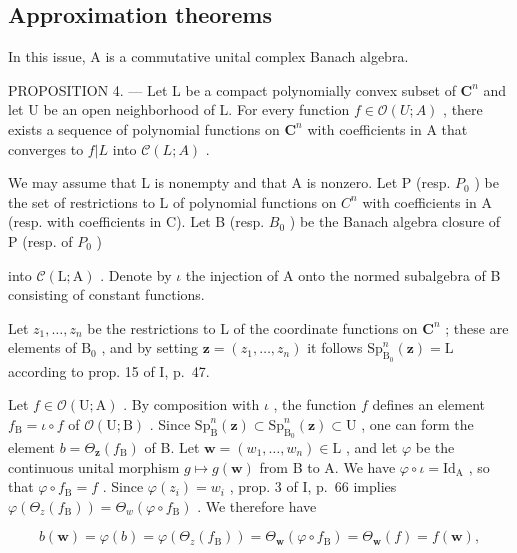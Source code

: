 \subsection{Approximation theorems}

In this issue, A is a commutative unital complex Banach algebra.

PROPOSITION 4. --- Let L be a compact polynomially convex subset of \(\mathbf{C}^{n}\) and let U be an open neighborhood of L. For every function \(f\in\mathcal{O}(U;A)\) , there exists a sequence of polynomial functions on \(\mathbf{C}^{n}\) with coefficients in A that converges to \(f|L\) into \(\mathcal{C}(L;A)\) .

We may assume that L is nonempty and that A is nonzero. Let P (resp. \(P_{0}\) ) be the set of restrictions to L of polynomial functions on \(C^{n}\) with coefficients in A (resp. with coefficients in C). Let B (resp. \(B_{0}\) ) be the Banach algebra closure of P (resp. of \(P_{0}\) )

into \(\mathcal{C}(\mathrm{L};\mathrm{A})\) . Denote by \(\iota\) the injection of A onto the normed subalgebra of B consisting of constant functions.

Let \(z_{1},\ldots,z_{n}\) be the restrictions to L of the coordinate functions on \(\mathbf{C}^{n}\) ; these are elements of \(\mathrm{B}_{0}\) , and by setting \(\boldsymbol{z}=(z_{1},\ldots,z_{n})\) it follows \(\mathrm{Sp}_{\mathrm{B}_{0}}^{n}(\boldsymbol{z})=\mathrm{L}\) according to prop. 15 of I, p.~47.

Let \(f \in \mathcal{O}(\mathrm{U};\mathrm{A})\) . By composition with \(\iota\) , the function \(f\) defines an element \(f_{\mathrm{B}} = \iota \circ f\) of \(\mathcal{O}(\mathrm{U};\mathrm{B})\) . Since \(\mathrm{Sp}_{\mathrm{B}}^{n}(\boldsymbol{z}) \subset \mathrm{Sp}_{\mathrm{B}_{0}}^{n}(\boldsymbol{z}) \subset \mathrm{U}\) , one can form the element \(b = \Theta_{\boldsymbol{z}}(f_{\mathrm{B}})\) of B. Let \(\boldsymbol{w} = (w_{1},\ldots ,w_{n}) \in \mathrm{L}\) , and let \(\varphi\) be the continuous unital morphism \(g \mapsto g(\boldsymbol{w})\) from B to A. We have \(\varphi \circ \iota = \mathrm{Id}_{\mathrm{A}}\) , so that \(\varphi \circ f_{\mathrm{B}} = f\) . Since \(\varphi (z_i) = w_i\) , prop. 3 of I, p.~66 implies \(\varphi (\Theta_z(f_{\mathrm{B}})) = \Theta_w(\varphi \circ f_{\mathrm{B}})\) . We therefore have

\[
b (\pmb {w}) = \varphi (b) = \varphi (\Theta_ {z} (f _ {\mathrm{B}})) = \Theta_ {\pmb {w}} (\varphi \circ f _ {\mathrm{B}}) = \Theta_ {\pmb {w}} (f) = f (\pmb {w}),
\]

